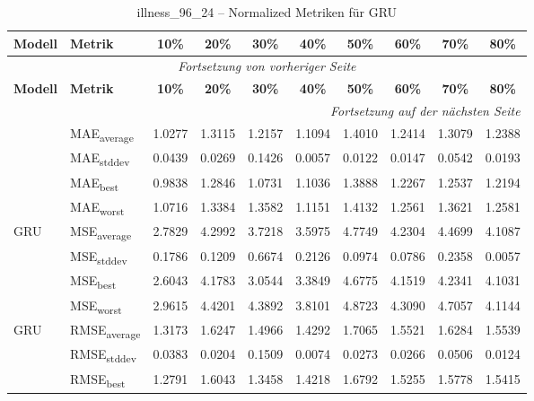 {\small
\begin{longtable}{l l c c c c c c c c}
    \toprule
    \textbf{Modell} & \textbf{Metrik} & \textbf{10\%} & \textbf{20\%} & \textbf{30\%} & \textbf{40\%} & \textbf{50\%} & \textbf{60\%} & \textbf{70\%} & \textbf{80\%} \\
    \midrule
    \endfirsthead
    \multicolumn{10}{c}{\textit{Fortsetzung von vorheriger Seite}} \\
    \toprule
    \textbf{Modell} & \textbf{Metrik} & \textbf{10\%} & \textbf{20\%} & \textbf{30\%} & \textbf{40\%} & \textbf{50\%} & \textbf{60\%} & \textbf{70\%} & \textbf{80\%} \\
    \midrule
    \endhead
    \midrule
    \multicolumn{10}{r}{\textit{Fortsetzung auf der nächsten Seite}} \\
    \midrule
    \endfoot
    \bottomrule
    \caption{illness_96_24 -- Normalized Metriken für GRU}
    \label{tab:illness_96_24_normalized_gru}
    \endlastfoot
\multirow{4}{*}{GRU} & MAE\textsubscript{average} & 1.0277 & 1.3115 & 1.2157 & 1.1094 & 1.4010 & 1.2414 & 1.3079 & 1.2388 \\
 & MAE\textsubscript{stddev} & 0.0439 & 0.0269 & 0.1426 & 0.0057 & 0.0122 & 0.0147 & 0.0542 & 0.0193 \\
 & MAE\textsubscript{best} & 0.9838 & 1.2846 & 1.0731 & 1.1036 & 1.3888 & 1.2267 & 1.2537 & 1.2194 \\
 & MAE\textsubscript{worst} & 1.0716 & 1.3384 & 1.3582 & 1.1151 & 1.4132 & 1.2561 & 1.3621 & 1.2581 \\
\cmidrule(lr){2-10}
\multirow{4}{*}{GRU} & MSE\textsubscript{average} & 2.7829 & 4.2992 & 3.7218 & 3.5975 & 4.7749 & 4.2304 & 4.4699 & 4.1087 \\
 & MSE\textsubscript{stddev} & 0.1786 & 0.1209 & 0.6674 & 0.2126 & 0.0974 & 0.0786 & 0.2358 & 0.0057 \\
 & MSE\textsubscript{best} & 2.6043 & 4.1783 & 3.0544 & 3.3849 & 4.6775 & 4.1519 & 4.2341 & 4.1031 \\
 & MSE\textsubscript{worst} & 2.9615 & 4.4201 & 4.3892 & 3.8101 & 4.8723 & 4.3090 & 4.7057 & 4.1144 \\
\cmidrule(lr){2-10}
\multirow{4}{*}{GRU} & RMSE\textsubscript{average} & 1.3173 & 1.6247 & 1.4966 & 1.4292 & 1.7065 & 1.5521 & 1.6284 & 1.5539 \\
 & RMSE\textsubscript{stddev} & 0.0383 & 0.0204 & 0.1509 & 0.0074 & 0.0273 & 0.0266 & 0.0506 & 0.0124 \\
 & RMSE\textsubscript{best} & 1.2791 & 1.6043 & 1.3458 & 1.4218 & 1.6792 & 1.5255 & 1.5778 & 1.5415 \\

\end{longtable}}
